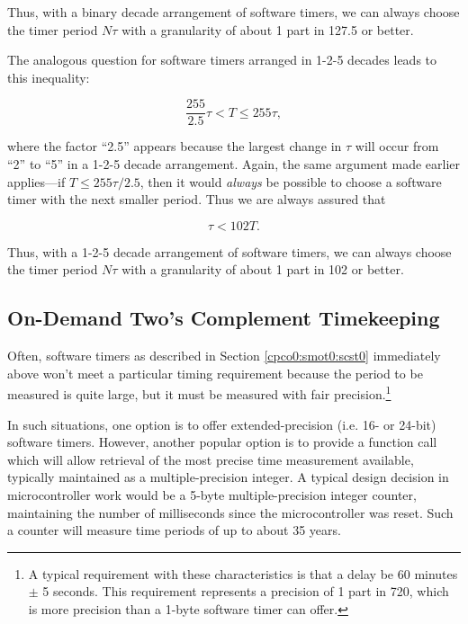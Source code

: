 \noindent{}Thus, with a binary decade arrangement of software timers, we
can always choose the timer period $N \tau$ with a granularity of about
1 part in 127.5 or better.

The analogous question for software timers arranged in 1-2-5 decades
leads to this inequality:

\begin{equation}
\label{eq:cpco0:smot0:scst0:04}
\frac{255}{2.5} \tau < T \leq 255 \tau ,
\end{equation}

\noindent{}where the factor ``2.5'' appears because the largest
change in $\tau$ will occur from ``2'' to ``5'' in a 1-2-5 decade
arrangement.  Again, the same argument made earlier 
applies---if $T \leq 255 \tau / 2.5$, then it would \emph{always}
be possible to choose a software timer with the next smaller period.
Thus we are always assured that

\begin{equation}
\label{eq:cpco0:smot0:scst0:05}
\tau < 102 T .
\end{equation}

\noindent{}Thus, with a 1-2-5 decade arrangement of software timers, we
can always choose the timer period $N \tau$ with a granularity of about
1 part in 102 or better.


\subsection{On-Demand Two's Complement Timekeeping}
\label{cpco0:smot0:sodt0}

Often, software timers as described in Section \ref{cpco0:smot0:scst0}
immediately above won't meet a particular timing requirement because
the period to be measured is quite large, but it must be measured with
fair precision.\footnote{A typical requirement with these characteristics
is that a delay be 60 minutes $\pm$ 5 seconds.  This requirement
represents a precision of 1 part in 720, which is more precision
than a 1-byte software timer can offer.}  

In such situations, one 
option is to offer extended-precision (i.e. 16- or 24-bit) software timers.
However, another popular option is to provide a function call which
will allow retrieval of the most precise time measurement available,
typically maintained as a multiple-precision integer.  A typical
design decision in microcontroller work would be a 5-byte multiple-precision
integer counter, maintaining the number of milliseconds since the 
microcontroller was reset.  Such a counter will measure time periods
of up to about 35 years.

